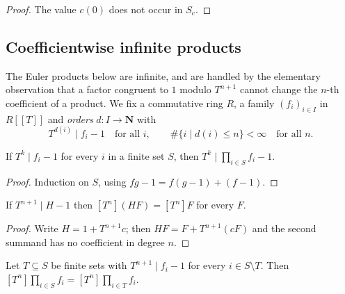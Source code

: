 \begin{proof}
  \leanok
  The value $c(0)$ does not occur in $S_c$.
\end{proof}

\subsection{Coefficientwise infinite products}

The Euler products below are infinite, and are handled by the elementary
observation that a factor congruent to $1$ modulo $T^{n+1}$ cannot change the
$n$-th coefficient of a product.  We fix a commutative ring $R$, a family
$(f_i)_{i\in I}$ in $R[[T]]$ and \emph{orders} $d\colon I\to\mathbf N$ with
\[
  T^{d(i)}\mid f_i-1\quad\text{for all }i,
  \qquad
  \#\{i\mid d(i)\le n\}<\infty\quad\text{for all }n .
\]

\begin{lemma}
  \label{lemma:weil-X-pow-dvd-prod-sub-one}
  \leanok

  If $T^k\mid f_i-1$ for every $i$ in a finite set $S$, then
  $T^k\mid\prod_{i\in S}f_i-1$.
\end{lemma}

\begin{proof}
  \leanok
  Induction on $S$, using
  $fg-1=f(g-1)+(f-1)$.
\end{proof}

\begin{lemma}
  \label{lemma:weil-coeff-mul-eq-of-X-pow-dvd-sub-one}
  \leanok

  If $T^{n+1}\mid H-1$ then $[T^n](HF)=[T^n]F$ for every $F$.
\end{lemma}

\begin{proof}
  \leanok
  Write $H=1+T^{n+1}c$; then $HF=F+T^{n+1}(cF)$ and the second summand has no
  coefficient in degree $n$.
\end{proof}

\begin{lemma}
  \label{lemma:weil-coeff-prod-congr}
  \leanok

  Let $T\subseteq S$ be finite sets with $T^{n+1}\mid f_i-1$ for every
  $i\in S\setminus T$.  Then
  $[T^n]\prod_{i\in S}f_i=[T^n]\prod_{i\in T}f_i$.
\end{lemma}

